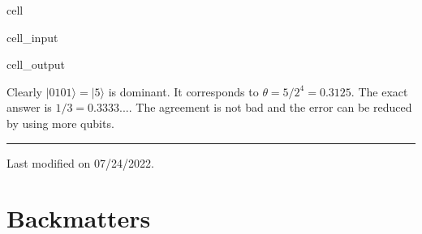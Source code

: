 \documentclass[letterpaper,10pt,english]{jupyterBook}
\begin{document}
\begin{sphinxuseclass}{cell}
\begin{sphinxVerbatimInput}
\begin{sphinxuseclass}{cell_input}
\begin{sphinxVerbatim}[commandchars=\\\{\}]
  

   
\end{sphinxVerbatim}

\end{sphinxuseclass}\end{sphinxVerbatimInput}
\begin{sphinxVerbatimOutput}

\begin{sphinxuseclass}{cell_output}
\noindent{}

\end{sphinxuseclass}\end{sphinxVerbatimOutput}

\end{sphinxuseclass}
\sphinxAtStartPar
Clearly \(|0101\rangle = |5\rangle\) is dominant. It corresponds to \(\theta = 5/2^4 = 0.3125\).  The exact answer is \(1/3=0.3333...\).  The agreement is not bad and the error can be reduced by using more qubits.


\bigskip\hrule\bigskip


\sphinxAtStartPar
Last modified on 07/24/2022.

\sphinxstepscope


\part{Backmatters}

\sphinxstepscope
\end{document}
